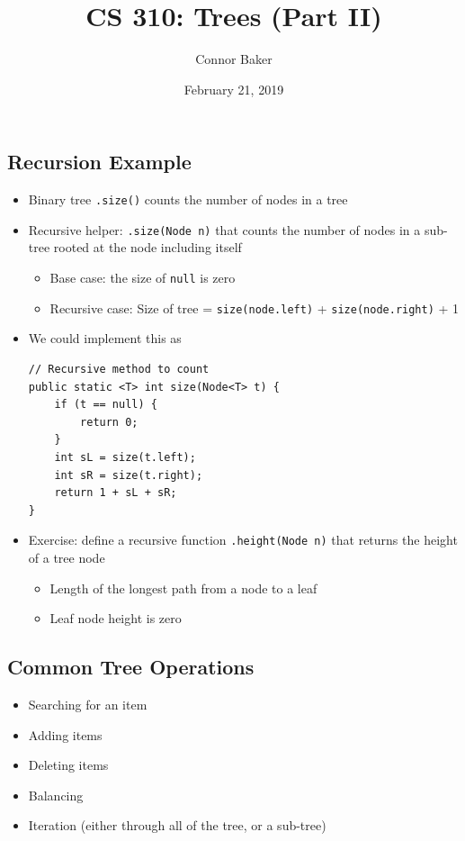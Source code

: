 \documentclass[10pt]{article}
\title{CS 310: Trees (Part II)}
\author{Connor Baker}
\date{February 21, 2019}
\begin{document}
\maketitle

\subsection*{Recursion Example}
\begin{itemize}
    \item Binary tree \texttt{.size()} counts the number of nodes in a tree
    \item Recursive helper: \texttt{.size(Node n)} that counts the number of nodes in a sub-tree rooted at the node including itself
    \begin{itemize}
        \item Base case: the size of \texttt{null} is zero
        \item Recursive case: Size of tree = \texttt{size(node.left)} + \texttt{size(node.right)} + 1
    \end{itemize}
    \item We could implement this as
    \begin{verbatim}
// Recursive method to count
public static <T> int size(Node<T> t) {
    if (t == null) {
        return 0;
    }
    int sL = size(t.left);
    int sR = size(t.right);
    return 1 + sL + sR;
}
    \end{verbatim}
    \item Exercise: define a recursive function \texttt{.height(Node n)} that returns the height of a tree node
    \begin{itemize}
        \item Length of the longest path from a node to a leaf
        \item Leaf node height is zero
    \end{itemize}
    
\end{itemize}

\subsection*{Common Tree Operations}
\begin{itemize}
    \item Searching for an item
    \item Adding items
    \item Deleting items
    \item Balancing
    \item Iteration (either through all of the tree, or a sub-tree)
\end{itemize}
\end{document}
